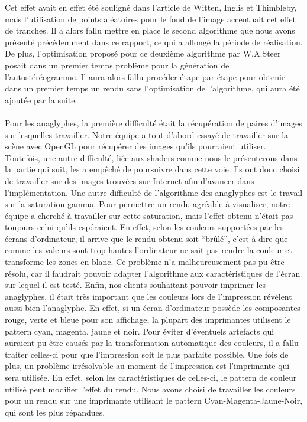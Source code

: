 Cet effet avait en effet été souligné dans l'article de Witten, Inglis et Thimbleby, mais l'utilisation de points aléatoires pour le fond de l'image accentuait cet effet de tranches. 
Il a alors fallu mettre en place le second algorithme que nous avons présenté précédemment dans ce rapport, ce qui a allongé la période de réalisation. De plus, l'optimisation proposé pour ce deuxième algorithme par W.A.Steer posait dans un premier temps problème pour la génération de l'autostéréogramme. Il aura alors fallu procéder étape par étape pour obtenir dans un premier temps un rendu sans l'optimisation de l'algorithme, qui aura été ajoutée par la suite.

\paragraph{}
Pour les anaglyphes, la première difficulté était la récupération de paires d'images sur lesquelles travailler. Notre équipe a tout d'abord essayé de travailler sur la scène avec OpenGL pour récupérer des images qu'ils pourraient utiliser. Toutefois, une autre difficulté, liée aux shaders comme nous le présenterons dans la partie qui suit, les a empêché de poursuivre dans cette voie. Ils ont donc choisi de travailler sur des images trouvées sur Internet afin d'avancer dans l'implémentation. 
Une autre difficulté de l'algorithme des anaglyphes est le travail sur la saturation gamma. Pour permettre un rendu agréable à visualiser, notre équipe a cherché à travailler sur cette saturation, mais l'effet obtenu n'était pas toujours celui qu'ils espéraient. En effet, selon les couleurs supportées par les écrans d'ordinateur, il arrive que le rendu obtenu soit ``brûlé'', c'est-à-dire que comme les valeurs sont trop hautes l'ordinateur ne sait pas rendre la couleur et transforme les zones en blanc. Ce problème n'a malheureusement pas pu être résolu, car il faudrait pouvoir adapter l'algorithme aux caractéristiques de l'écran sur lequel il est testé.
Enfin, nos clients souhaitant pouvoir imprimer les anaglyphes, il était très important que les couleurs lors de l'impression révèlent aussi bien l'anaglyphe. En effet, si un écran d'ordinateur possède les composantes rouge, verte et bleue pour son affichage, la plupart des imprimantes utilisent le pattern cyan, magenta, jaune et noir. Pour éviter d'éventuels artefacts qui auraient pu être causés par la transformation automatique des couleurs, il a fallu traiter celles-ci pour que l'impression soit le plus parfaite possible. Une fois de plus, un problème irrésolvable au moment de l'impression est l'imprimante qui sera utilisée. En effet, selon les caractéristiques de celles-ci, le pattern de couleur utilisé peut modifier l'effet du rendu. Nous avons choisi de travailler les couleurs pour un rendu sur une imprimante utilisant le pattern Cyan-Magenta-Jaune-Noir, qui sont les plus répandues.


